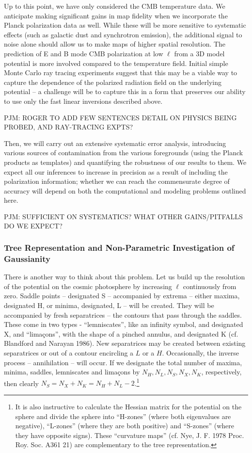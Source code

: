 \documentclass[psfig,11pt]{article}
\begin{document}
Up to this point, we have only considered the CMB temperature data. We anticipate making significant gains in map fidelity when we incorporate the Planck polarization data as well. While these will be more sensitive to systematic effects (such as galactic dust and synchrotron emission), the additional signal to noise alone should allow us to make maps of higher spatial resolution. The prediction of E and B mode CMB polarization at low $\ell$ from a 3D model potential is more involved compared to the temperature field. Initial simple Monte Carlo ray tracing experiments suggest that this may be a viable way to capture the dependence of the polarized radiation field on the underlying potential -- a challenge will be to capture this in a form that preserves our ability to use only the fast linear inversions described above.

PJM: ROGER TO ADD FEW SENTENCES DETAIL ON PHYSICS BEING PROBED, AND RAY-TRACING EXPTS?

Then, we will carry out an extensive systematic error analysis, introducing various sources of contamination from the various foregrounds (using the Planck products as templates) and quantifying the robustness of our results to them. We expect all our inferences to increase in precision as a result of including the polarization information; whether we can reach the commensurate degree of accuracy will depend on both the computational and modeling problems outlined here.

PJM: SUFFICIENT ON SYSTEMATICS? WHAT OTHER GAINS/PITFALLS DO WE EXPECT?


\subsubsection{Tree Representation and Non-Parametric Investigation of Gaussianity}

There is another way to think about this problem. Let us build up the resolution of the potential on the cosmic photosphere by increasing $\ell$ continuously from zero. Saddle points -- designated  S -- accompanied by extrema -- either maxima, designated H,  or minima, designated, L -- will be created. They will be accompanied by fresh separatrices -- the contours that pass through the saddles. These come in two types - ``lemniscates'', like an infinity symbol, and designated X, and ``lima\c cons'', with the shape of a pinched annulus, and designated K (cf. Blandford and Narayan 1986). New separatrices may be created between existing separatrices or out of a contour encircling a $L$ or a $H$.  Occasionally, the inverse process -- annihilation -- will occur. If we designate the total number of maxima, minima, saddles, lemniscates and lima\c cons by $N_H,N_L,N_S,N_X,N_K$, respectively, then clearly $N_S=N_X+N_K=N_H+N_L-2$.\footnote{It is also instructive to calculate the Hessian matrix for the potential on the sphere and divide the sphere into ``H-zones'' (where both eigenvalues are negative), ``L-zones'' (where they are both positive) and ``S-zones'' (where they have opposite signs). These ``curvature maps'' (cf. Nye, J. F. 1978 Proc. Roy. Soc. A361 21) are complementary to the tree representation.}
\end{document}
